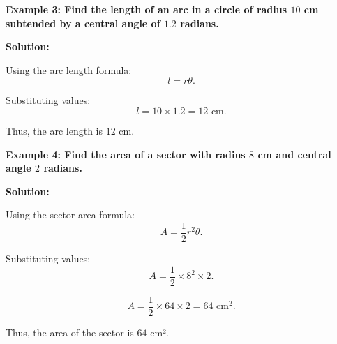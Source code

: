 \begin{flushleft}
	\textbf{Example 3: Find the length of an arc in a circle of radius $10$ cm subtended by a central angle of $1.2$ radians.}
	
	\vspace{0.5cm}
	\textbf{Solution:}
	\vspace{0.5cm}
	
	Using the arc length formula:
	\[
	l = r\theta.
	\]
	
	Substituting values:
	\[
	l = 10 \times 1.2 = 12 \text{ cm}.
	\]
	
	Thus, the arc length is $12$ cm.
\end{flushleft}

\begin{flushleft}
	\textbf{Example 4: Find the area of a sector with radius $8$ cm and central angle $2$ radians.}
	
	\vspace{0.5cm}
	\textbf{Solution:}
	\vspace{0.5cm}
	
	Using the sector area formula:
	\[
	A = \frac{1}{2} r^2 \theta.
	\]
	
	Substituting values:
	\[
	A = \frac{1}{2} \times 8^2 \times 2.
	\]
	
	\[
	A = \frac{1}{2} \times 64 \times 2 = 64 \text{ cm}^2.
	\]
	
	Thus, the area of the sector is $64$ cm².
\end{flushleft}
